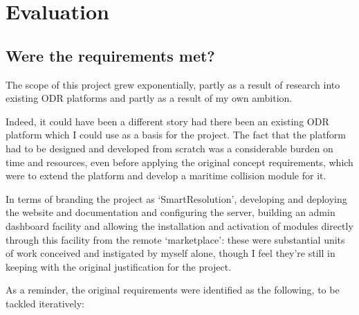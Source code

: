 \chapter{Evaluation}%

\section{Were the requirements met?}

The scope of this project grew exponentially, partly as a result of research into existing ODR platforms and partly as a result of my own ambition.

Indeed, it could have been a different story had there been an existing ODR platform which I could use as a basis for the project. The fact that the platform had to be designed and developed from scratch was a considerable burden on time and resources, even before applying the original concept requirements, which were to extend the platform and develop a maritime collision module for it.

In terms of branding the project as `SmartResolution', developing and deploying the website and documentation and configuring the server, building an admin dashboard facility and allowing the installation and activation of modules directly through this facility from the remote `marketplace': these were substantial units of work conceived and instigated by myself alone, though I feel they're still in keeping with the original justification for the project.

As a reminder, the original requirements were identified as the following, to be tackled iteratively:

